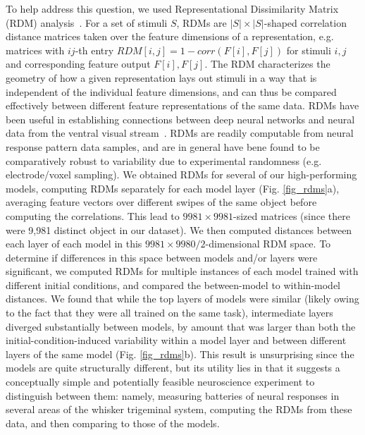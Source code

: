 To help address this question, we used Representational Dissimilarity Matrix (RDM) analysis~\cite{Kriegeskorte2008}.
For a set of stimuli $S$, RDMs are $|S| \times |S|$-shaped correlation distance matrices taken over the feature dimensions of a representation, e.g. matrices with $ij$-th entry $RDM[i, j] = 1 - corr(F[i], F[j])$ for stimuli $i, j$ and corresponding feature output $F[i], F[j]$.
The RDM characterizes the geometry of how a given representation lays out stimuli in a way that is independent of the individual feature dimensions, and can thus be compared effectively between different feature representations of the same data.
RDMs have been useful in establishing connections between deep neural networks and neural data from the ventral visual stream~\cite{cadieu2014deep, Yamins2014, khaligh2014deep}.
RDMs are readily computable from neural response pattern data samples, and are in general have bene found to be comparatively robust to variability due to experimental randomness (e.g. electrode/voxel sampling).
We obtained RDMs for several of our high-performing models, computing RDMs separately for each model layer (Fig. \ref{fig_rdms}a), averaging feature vectors over different swipes of the same object before computing the correlations.
This lead to $9981\times9981$-sized matrices (since there were 9,981 distinct object in our dataset).
We then computed distances between each layer of each model in this $9981\times9980/2$-dimensional RDM space.
To determine if differences in this space between models and/or layers were significant, we computed RDMs for multiple instances of each model trained with different initial conditions, and compared the between-model to within-model distances.
We found that while the top layers of models were similar (likely owing to the fact that they were all trained on the same task), intermediate layers diverged substantially between models, by amount that was larger than both the initial-condition-induced variability within a model layer and between different layers of the same model (Fig. \ref{fig_rdms}b).
This result is unsurprising since the models are quite structurally different, but its utility lies in that it suggests a conceptually simple and potentially feasible neuroscience experiment to distinguish between them: namely, measuring batteries of neural responses in several areas of the whisker trigeminal system, computing the RDMs from these data, and then comparing to those of the models.

